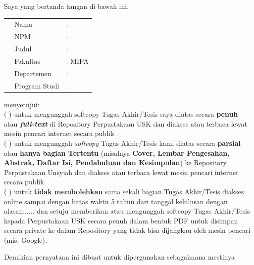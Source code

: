\pagestyle{preliminarypage}

\makeatletter
\noindent
Saya yang bertanda tangan di bawah ini,
\vspace{-0.1cm}
\begin{table}[H]
{\renewcommand{\arraystretch}{0.7}
\begin{tabular}{p{0.6cm}ll}
	& Nama   		&: \@fullname \\
	& NPM       	&: \@idnum \\
	& Judul 		&: \@judul \\
	& Fakultas		&: MIPA \\
	& Departemen 	&: \@dept \\
	& Program Studi &: \@prodi \\

\end{tabular}
}
\end{table}
\onehalfspacing
\vspace{-0.4cm}
\noindent
menyetujui: \\ 
( ) untuk mengunggah softcopy Tugas Akhir/Tesis saya diatas secara \textbf{penuh} atau \textit{\textbf{full-text}} di Repository Perpustakaan USK dan diakses atau terbaca lewat mesin pencari internet secara publik \\
( ) untuk mengunggah \textit{softcopy} Tugas Akhir/Tesis kami diatas secara \textbf{parsial} atau \textbf{hanya bagian Tertentu} (misalnya \textbf{Cover, Lembar Pengesahan, Abstrak, Daftar Isi, Pendahuluan dan Kesimpulan}) ke Repository Perpustakaan Unsyiah dan diakses atau terbaca lewat mesin pencari internet secara publik \\
( ) untuk \textbf{tidak membolehkan} sama sekali bagian Tugas Akhir/Tesis diakses online sampai dengan batas waktu 5 tahun dari tanggal kelulusan dengan alasan:.....
\vspace{0.4cm}
\noindent
dan setuju memberikan atau mengunggah softcopy Tugas Akhir/Tesis kepada Perpustakaan USK secara penuh dalam bentuk PDF untuk disimpan secara private ke dalam Repository yang tidak bisa dijangkau oleh mesin pencari (mis. Google).

\vspace{0.4cm}
\noindent
Demikian pernyataan ini dibuat untuk dipergunakan sebagaimana mestinya

